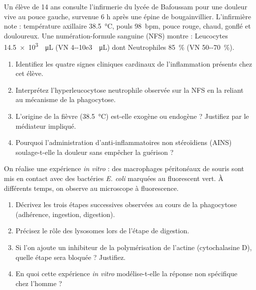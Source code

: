 \documentclass[11pt]{article}
\begin{document}
\begin{exercice}
Un élève de 14 ans consulte l'infirmerie du lycée de Bafoussam pour une douleur vive au pouce gauche, survenue 6 h après une épine de bougainvillier. L'infirmière note : température axillaire \SI{38,5}{\celsius}, pouls \SI{98}{bpm}, pouce rouge, chaud, gonflé et douloureux. Une numération-formule sanguine (NFS) montre : Leucocytes \SI{14,5e3}{\per\micro\liter} (VN \SI{4--10e3}{\per\micro\liter}) dont Neutrophiles \SI{85}{\%} (VN \SI{50--70}{\%}).
\begin{enumerate}
    \item Identifiez les quatre signes cliniques cardinaux de l'inflammation présents chez cet élève.
    \item Interprétez l'hyperleucocytose neutrophile observée sur la NFS en la reliant au mécanisme de la phagocytose.
    \item L'origine de la fièvre (\SI{38,5}{\celsius}) est-elle exogène ou endogène ? Justifiez par le médiateur impliqué.
    \item Pourquoi l'administration d'anti-inflammatoires non stéroïdiens (AINS) soulage-t-elle la douleur sans empêcher la guérison ?
\end{enumerate}
\end{exercice}

\begin{exercice}
On réalise une expérience \textit{in vitro} : des macrophages péritonéaux de souris sont mis en contact avec des bactéries \textit{E. coli} marquées au fluorescent vert. À différents temps, on observe au microscope à fluorescence.
\begin{enumerate}
    \item Décrivez les trois étapes successives observées au cours de la phagocytose (adhérence, ingestion, digestion).
    \item Précisez le rôle des lysosomes lors de l'étape de digestion.
    \item Si l'on ajoute un inhibiteur de la polymérisation de l'actine (cytochalasine D), quelle étape sera bloquée ? Justifiez.
    \item En quoi cette expérience \textit{in vitro} modélise-t-elle la réponse non spécifique chez l'homme ?
\end{enumerate}
\end{exercice}
\end{document}
